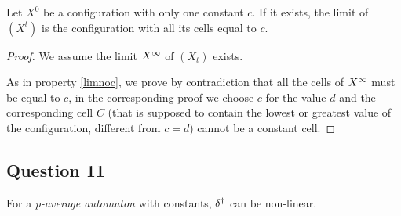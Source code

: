 
\begin{prop}
  \label{twocst}
  Let $X^0$ be a configuration with only one constant $c$. If it exists, the limit of $(X^t)$ is the configuration with all its cells equal to $c$.
\end{prop}

\begin{proof}
  We assume the limit $X^{\infty}$ of $(X_t)$ exists.
  
  As in property \ref{limnoc}, we prove by contradiction that all the cells of $X^{\infty}$ must be equal to $c$, in the corresponding proof we choose $c$ for the value $d$ and the corresponding cell $C$ (that is supposed to contain the lowest or greatest value of the configuration, different from $c=d$) cannot be a constant cell.
\end{proof}


\subsection*{Question 11}

 \begin{prop}
    For a \textit{p-average automaton} with constants, $\delta^{\dag}$ can be non-linear.
 \end{prop}

